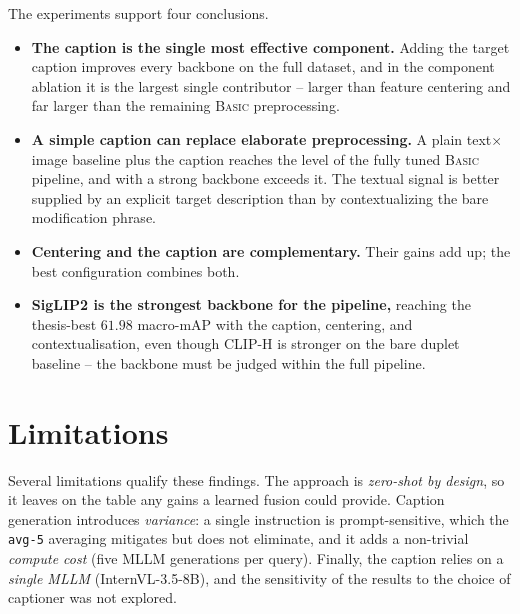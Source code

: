 The experiments support four conclusions.
\begin{itemize}
  \item \textbf{The caption is the single most effective component.} Adding the
        target caption improves every backbone on the full dataset, and in the
        component ablation it is the largest single contributor -- larger than
        feature centering and far larger than the remaining \textsc{Basic}
        preprocessing.
  \item \textbf{A simple caption can replace elaborate preprocessing.} A plain
        text$\times$image baseline plus the caption reaches the level of the
        fully tuned \textsc{Basic} pipeline, and with a strong backbone exceeds
        it. The textual signal is better supplied by an explicit target
        description than by contextualizing the bare modification phrase.
  \item \textbf{Centering and the caption are complementary.} Their gains add
        up; the best configuration combines both.
  \item \textbf{SigLIP2 is the strongest backbone for the pipeline,} reaching
        the thesis-best $61.98$ macro-mAP with the caption, centering, and
        contextualisation, even though CLIP-H is stronger on the bare duplet
        baseline -- the backbone must be judged within the full pipeline.
\end{itemize}

\section{Limitations}\label{sect:concl_limitations}

Several limitations qualify these findings. The approach is \emph{zero-shot by
design}, so it leaves on the table any gains a learned fusion could provide.
Caption generation introduces \emph{variance}: a single instruction is
prompt-sensitive, which the \texttt{avg-5} averaging mitigates but does not
eliminate, and it adds a non-trivial \emph{compute cost} (five MLLM generations
per query). Finally, the caption relies on a \emph{single MLLM}
(InternVL-3.5-8B), and the sensitivity of the results to the choice of captioner
was not explored.

